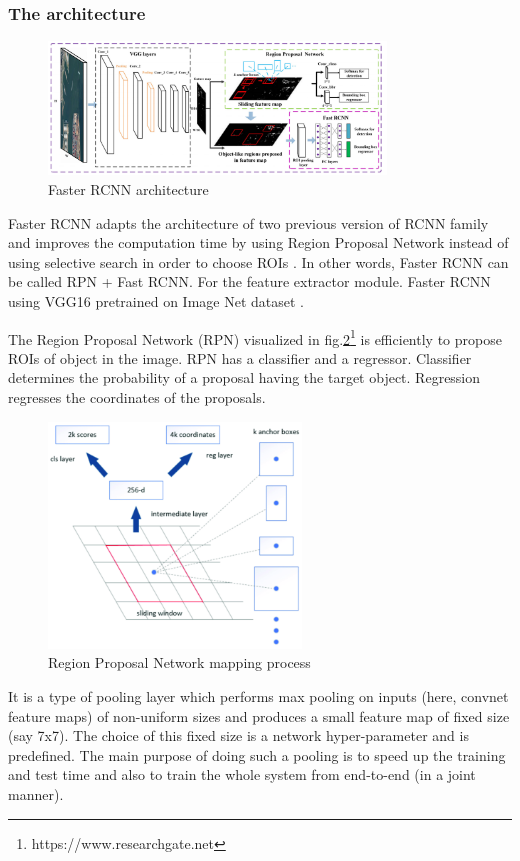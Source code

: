 \subsubsection{The architecture}
\begin{figure}[h!]
    \centering
    \includegraphics[width=0.8\textwidth]{Chapters/Fig/FrRCNN_arch.png}
    \caption{Faster \acrshort{RCNN} architecture}
    \label{fig:frrcnn_arc}
\end{figure}
Faster \acrshort{RCNN} adapts the architecture of two previous version of \acrshort{RCNN} family and improves the computation time by using Region Proposal Network instead of using selective search in order to choose \acrshort{ROI}s \cite{FrRCNN}. 
In other words, Faster \acrshort{RCNN} can be called \acrshort{RPN} + Fast \acrshort{RCNN}. For the feature extractor module. Faster \acrshort{RCNN} using VGG16\cite{vgg} pretrained on Image Net dataset \cite{FrRCNN}.\par
The Region Proposal Network (RPN) visualized in fig.\ref{fig:RPN}\footnote{https://www.researchgate.net} is efficiently to propose \acrshort{ROI}s of object in the image. 
\acrshort{RPN} has a classifier and a regressor. Classifier determines the probability of a proposal having the target object. Regression regresses the coordinates of the proposals.
\begin{figure}[h!]
    \centering
    \includegraphics[width=0.6\textwidth]{Chapters/Fig/RPN_arc_1.png}
    \caption{Region Proposal Network mapping process}
    \label{fig:RPN}
\end{figure}
\par
It is a type of pooling layer which performs max pooling on inputs (here, convnet feature maps) 
of non-uniform sizes and produces a small feature map of fixed size (say 7x7)\cite{FrRCNN}. 
The choice of this fixed size is a network hyper-parameter and is predefined.
The main purpose of doing such a pooling is to speed up the training and test time and also to train the whole system from end-to-end (in a joint manner)\cite{FrRCNN}.
\pagebreak
